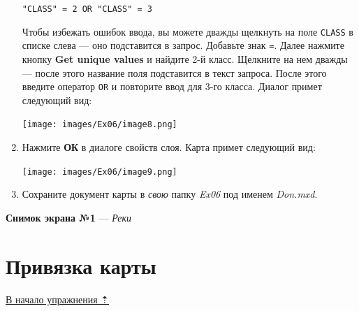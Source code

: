 \documentclass[12pt,]{book}
\begin{document}
\begin{enumerate}
  \texttt{"CLASS"\ =\ 2\ OR\ "CLASS"\ =\ 3}

  Чтобы избежать ошибок ввода, вы можете дважды щелкнуть на поле \texttt{CLASS} в списке слева --- оно подставится в запрос. Добавьте знак \texttt{=}. Далее нажмите кнопку \textbf{Get unique values} и найдите 2-й класс. Щелкните на нем дважды --- после этого название поля подставится в текст запроса. После этого введите оператор \texttt{OR} и повторите ввод для 3-го класса. Диалог примет следующий вид:

  \texttt{[image: images/Ex06/image8.png]}
\item
  Нажмите \textbf{ОК} в диалоге свойств слоя. Карта примет следующий вид:

  \texttt{[image: images/Ex06/image9.png]}
\item
  Сохраните документ карты в \emph{свою} папку \emph{Ex06} под именем \emph{Don.mxd}.
\end{enumerate}

\textbf{Снимок экрана №1} --- \emph{Реки}

\hypertarget{map-ref-hydrogeologic-referencing}{%
\section{Привязка карты}\label{map-ref-hydrogeologic-referencing}}

\protect\hyperlink{map-ref-hydrogeologic}{В начало упражнения ⇡}
\end{document}
